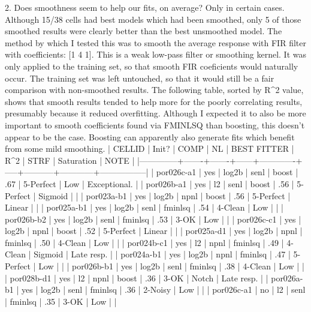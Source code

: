 2. Does smoothness seem to help our fits, on average?
   Only in certain cases. Although 15/38 cells had best models which had been smoothed, only 5 of those smoothed results were clearly better than the best unsmoothed model.
   The method by which I tested this was to smooth the average response with FIR filter with coefficients: [1 4 1]. This is a weak low-pass filter or smoothing kernel. It was only applied to the training set, so that smooth FIR coeficients would naturally occur. The training set was left untouched, so that it would still be a fair comparison with non-smoothed results. 
   The following table, sorted by R^2 value, shows that smooth results tended to help more for the poorly correlating results, presumably because it reduced overfitting. Although I expected it to also be more important to smooth coefficients found via FMINLSQ than boosting, this doesn't appear to be the case. Boosting can apparently also generate fits which benefit from some mild smoothing.
     | CELLID       | Init? | COMP  | NL   | BEST FITTER | R^2 | STRF      | Saturation | NOTE            |
     |--------------+-------+-------+------+-------------+-----+-----------+------------+-----------------|
     | por026c-a1   | yes   | log2b | senl | boost       | .67 | 5-Perfect | Low        | Exceptional.    |
     | por026b-a1   | yes   | l2    | senl | boost       | .56 | 5-Perfect | Sigmoid    |                 |
     | por023a-b1   | yes   | log2b | npnl | boost       | .56 | 5-Perfect | Linear     |                 |
     | por025a-b1   | yes   | log2b | senl | fminlsq     | .54 | 4-Clean   | Low        |                 |
     | por026b-b2   | yes   | log2b | senl | fminlsq     | .53 | 3-OK      | Low        |                 |
     | por026c-c1   | yes   | log2b | npnl | boost       | .52 | 5-Perfect | Linear     |                 |
     | por025a-d1   | yes   | log2b | npnl | fminlsq     | .50 | 4-Clean   | Low        |                 |
     | por024b-c1   | yes   | l2    | npnl | fminlsq     | .49 | 4-Clean   | Sigmoid    | Late resp.      |
     | por024a-b1   | yes   | log2b | npnl | fminlsq     | .47 | 5-Perfect | Low        |                 |
     | por026b-b1   | yes   | log2b | senl | fminlsq     | .38 | 4-Clean   | Low        |                 |
     | por028b-d1   | yes   | l2    | npnl | boost       | .36 | 3-OK      | Notch      | Late resp.      |
     | por026a-b1   | yes   | log2b | senl | fminlsq     | .36 | 2-Noisy   | Low        |                 |
     | por026c-a1   | no    | l2    | senl | fminlsq     | .35 | 3-OK      | Low        |                 |
